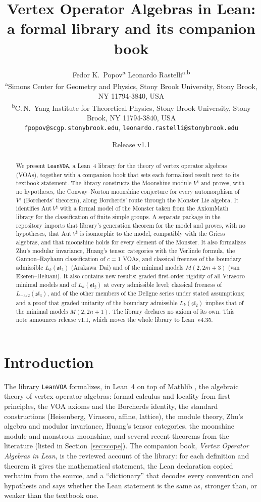 \documentclass[10pt]{article}
\title{Vertex Operator Algebras in Lean:\\ a formal library and its companion book}
\author{Fedor K.\ Popov\textsuperscript{a} \quad Leonardo Rastelli\textsuperscript{a,b}\\[0.8em]
  \small\textsuperscript{a}Simons Center for Geometry and Physics, Stony Brook University, Stony Brook, NY 11794-3840, USA\\
  \small\textsuperscript{b}C.\,N.\ Yang Institute for Theoretical Physics, Stony Brook University, Stony Brook, NY
  11794-3840, USA\\[0.5em]
  \small\texttt{fpopov@scgp.stonybrook.edu}, \texttt{leonardo.rastelli@stonybrook.edu}}
\date{Release v1.1}
\newcommand{\sltwo}{\mathfrak{sl}_2}
\newcommand{\slthree}{\mathfrak{sl}_3}
\begin{document}
\maketitle

\begin{abstract}
  We present \texttt{LeanVOA}, a Lean~4 library for the theory of vertex operator algebras (VOAs), together with a
  companion book that sets each formalized result next to its textbook statement. The library constructs the
  Moonshine module $V^\natural$ and proves, with no hypotheses, the Conway--Norton moonshine conjecture for every
  automorphism of $V^\natural$ (Borcherds' theorem), along Borcherds' route through the Monster Lie algebra. It
  identifies $\mathrm{Aut}\,V^\natural$ with a formal model of the Monster taken from the AxiomMath library for the
  classification of finite simple groups. A separate package in the repository imports that library's generation
  theorem for the model and proves, with no hypotheses, that $\mathrm{Aut}\,V^\natural$ is isomorphic to the model,
  compatibly with the Griess algebras, and that moonshine holds for every element of the Monster. It also formalizes Zhu's modular invariance, Huang's tensor
  categories with the Verlinde formula, the Gannon--Rayhaun classification of $c=1$ VOAs, and classical freeness of the boundary admissible
  $L_k(\sltwo)$ (Arakawa--Dai) and of the minimal models $M(2,2m+3)$ (van Ekeren--Heluani). It also contains new
  results: graded first-order rigidity of all Virasoro minimal models and of $L_k(\sltwo)$ at every admissible level; classical freeness of $L_{-3/2}(\slthree)$, and of the other members of the Deligne series under stated
  assumptions; and a proof that graded
  unitarity of the boundary admissible $L_k(\sltwo)$ implies that of the minimal models $M(2,2n+1)$. The library
  declares no axiom of its own. This note announces release v1.1, which moves the whole library to Lean~v4.35.
\end{abstract}

\section{Introduction}

The library \texttt{LeanVOA} formalizes, in Lean~4 \cite{lean4} on top of Mathlib \cite{mathlib}, the algebraic
theory of vertex operator algebras: formal calculus and locality from first principles, the VOA axioms
and the Borcherds identity, the standard constructions (Heisenberg, Virasoro, affine, lattice), the module theory,
Zhu's algebra and modular invariance, Huang's tensor categories, the moonshine module and monstrous moonshine,
and several recent theorems from the literature (listed in Section~\ref{sec:scope}). The companion book, \emph{Vertex Operator Algebras in Lean}, is the
reviewed account of the library: for each definition and theorem it gives the mathematical statement, the Lean
declaration copied verbatim from the source, and a ``dictionary'' that decodes every convention and hypothesis
and says whether the Lean statement is the same as, stronger than, or weaker than the textbook one.
\end{document}
